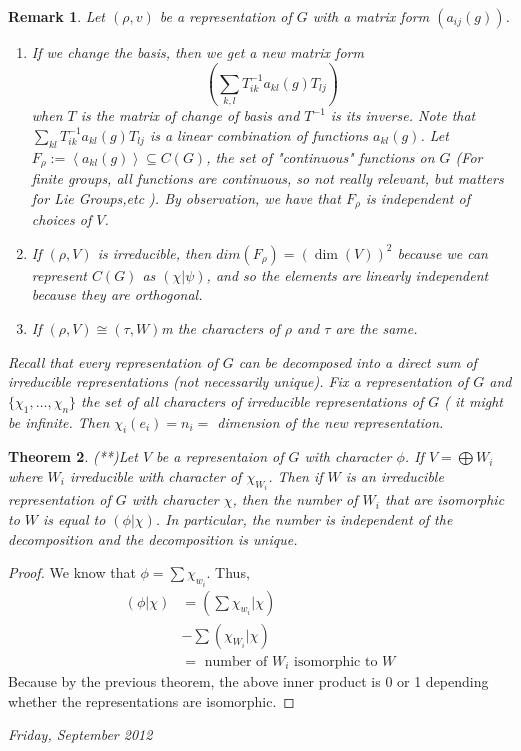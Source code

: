 \documentclass[letterpaper, leqno, 12pt]{article}
\newcommand{\fin}{\qquad \quad \hfill \framebox[1.75mm][l]{\,}}
\providecommand{\ip}[1]{\left\langle #1 \right\rangle}
\newcommand {\repV} {(\rho,V)}
\newcommand {\repW} {(\tau,W)}
\theoremstyle{stdthm}
\newtheorem{thm}{Theorem}
\theoremstyle{stddef}
\newtheorem{rem}[thm]{Remark} %
\theoremstyle{stdnonum}
\theoremstyle{stdqands}
\theoremstyle{stdbold}
\begin{document}
\begin{rem}
Let $(\rho,v)$ be a representation of $G$ with a matrix form $(a_{ij}(g))$.

\begin{enumerate}
\item If we change the basis, then we get a new matrix form 
\[\left( \sum_{k,l} T_{ik}^{-1}a_{kl}(g)T_{lj} \right) \]
when $T$ is the matrix of change of basis and $T^{-1}$ is its inverse. Note that $\sum_{kl}T_{ik}^{-1}a_{kl}(g)T_{lj}$ is a linear combination of functions $a_{kl}(g)$. Let $F_\rho := \ip{a_{kl}(g)} \subseteq C(G)$, the set of "continuous" functions on $G$ (For finite groups, all functions are continuous, so not really relevant, but matters for Lie Groups,etc ). By observation, we have that $F_\rho$ is independent of choices of $V$.

\item If $(\rho,V)$ is irreducible, then $dim(F_\rho) = (\dim (V))^2$ because we can represent $C(G)$ as $(\chi|\psi)$, and so the elements are linearly independent because they are orthogonal.  

\item If $\repV \cong \repW$m the characters of $\rho$ and $\tau$ are the same. 
\end{enumerate}

Recall that every representation of $G$ can be decomposed into a direct sum of irreducible representations (not necessarily unique). Fix a representation of $G$ and $\{\chi_1,\dots, \chi_n\}$ the set of all characters of irreducible representations of $G$ ( it might be infinite. Then $\chi_i(e_i) = n_i=$ dimension of the new representation.

\end{rem}

\begin{thm}
(**)Let $V$ be a representaion of $G$ with character $\phi$. If $V = \bigoplus W_i$ where  $W_i$ irreducible with character of $\chi_{W_i}$. Then if $W$ is an irreducible representation of $G$ with character $\chi$, then the number of $W_i$ that are isomorphic to $W$ is equal to $(\phi|\chi)$. In particular, the number is independent of the decomposition and the decomposition is unique. 
\end{thm}

\begin{proof}
We know that $\phi = \sum \chi_{w_i}$. Thus,
\begin{align*}
(\phi|\chi) &= (\sum \chi_{w_i}|\chi)\\
&- \sum(\chi_{W_i}|\chi)\\
&= \text{ number of } W_i \text{ isomorphic to } W
\end{align*}
Because by the previous theorem, the above inner product is 0 or 1 depending whether the representations are isomorphic. 
\end{proof}
\newpage
\begin{center}
\emph{Friday, September 2012}
\end{center}
\end{document}
